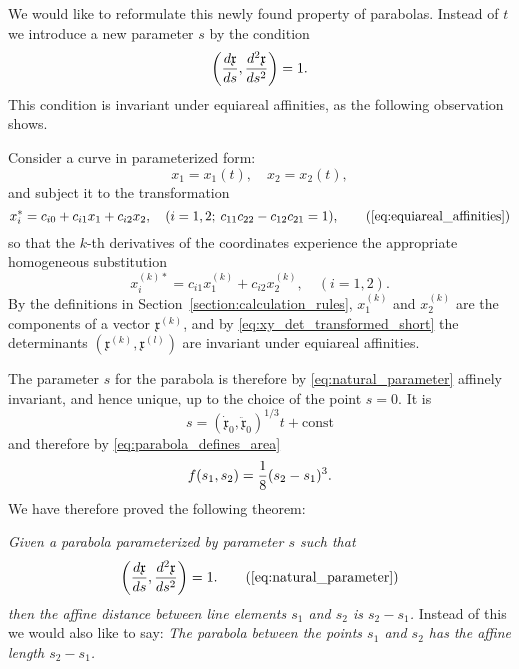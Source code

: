 \documentclass[11pt]{book} \usepackage{amssymb}
\newcommand{\myvec}[1]{\mathfrak{#1}}
\newcommand{\vecx}{\myvec{x}}
\newcommand{\vecderiv}[1]{\dot{\myvec{#1}}}
\newcommand{\vecderivv}[1]{\ddot{\myvec{#1}}}
\begin{document}
We would like to reformulate this newly found property of parabolas. Instead of
$t$ we introduce a new parameter $s$ by the condition
\begin{equation}
  \label{eq:natural_parameter}
  \left({d\vecx\over ds},{d^2\vecx\over ds^2}\right)=1.
\end{equation}
This condition is invariant under equiareal affinities, as the following 
observation shows.

Consider a curve in parameterized form:
\begin{equation}
  \label{eq:parameterized_curve}
  x_1=x_1(t),\quad x_2=x_2(t),
\end{equation}
and subject it to the transformation 
\begin{equation*}
  x_i^*=c_{i0}+c_{i1}x_1+c_{i2}x_2,\quad (i=1,2;\: c_{11}c_{22}-c_{12}c_{21}=1),
  \tag{\ref{eq:equiareal_affinities}}
\end{equation*}
so that the $k$-th derivatives of the coordinates experience the appropriate
homogeneous substitution
\begin{equation}
  \label{eq:deriv_transform}
  x_i^{(k)*}=c_{i1}x_1^{(k)}+c_{i2}x_2^{(k)}, \quad (i=1,2).
\end{equation}
By the definitions in Section~\ref{section:calculation_rules}, $x_1^{(k)}$ and
$x_2^{(k)}$ are the components of a vector $\vecx^{(k)}$, and by 
\eqref{eq:xy_det_transformed_short} the determinants 
$(\vecx^{(k)},\vecx^{(l)})$ are invariant under equiareal affinities.

The parameter $s$ for the parabola is therefore by \eqref{eq:natural_parameter}
affinely invariant, and hence unique, up to the choice of the point $s=0$. It
is
\begin{equation*}
  s=(\vecderiv{x}_0,\vecderivv{x}_0)^{1/3}t+\mbox{const}
\end{equation*}
and therefore by \eqref{eq:parabola_defines_area}
\begin{equation}
  \label{eq:area_by_natural_param}
  f(s_1,s_2)={1\over 8}(s_2-s_1)^3.
\end{equation}
We have therefore proved the following theorem:

{\em Given a parabola parameterized by parameter $s$ such that
  \begin{equation}
    \left({d\vecx\over ds},{d^2\vecx\over ds^2}\right)=1.
    \tag{\ref{eq:natural_parameter}}
  \end{equation}
  then the affine distance between line elements $s_1$ and $s_2$ is $s_2-s_1$.}
Instead of this we would also like to say: {\em The parabola between the points
$s_1$ and $s_2$ has the affine length $s_2-s_1$.}
\end{document}
